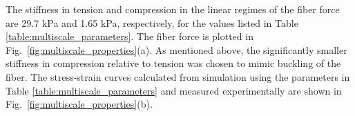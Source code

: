 \documentclass[]{interact}
\begin{document}
The stiffness in tension and compression in the linear regimes of the fiber force are 29.7 kPa and 1.65 kPa, respectively, for the values listed in Table \ref{table:multiscale_parameters}. The fiber force is plotted in Fig.\ \ref{fig:multiscale_properties}(a). As mentioned above, the significantly smaller stiffness in compression relative to tension was chosen to mimic buckling of the fiber. The stress-strain curves calculated from simulation using the parameters in Table \ref{table:multiscale_parameters} and measured experimentally are shown in Fig.\ \ref{fig:multiscale_properties}(b).
%
\end{document}
